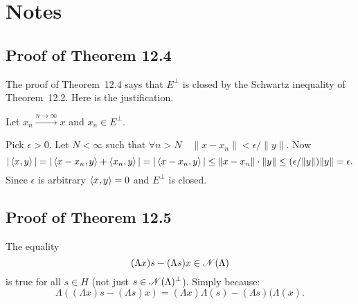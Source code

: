 
\section{Notes}

\subsection{Proof of Theorem 12.4}


The proof of Theorem~12.4 says that \(E^\perp\) is closed by the
Schwartz inequality of Theorem~12.2. Here is the justification.

Let \(x_n \xrightarrow{n\to \infty} x\) and \(x_n \in E^\perp\).

Pick \(\epsilon > 0\). Let \(N<\infty\) such that
\(\forall n>N \quad \|x-x_n\| < \epsilon/\|y\|\).
Now
\begin{equation*}
|\left\langle x, y \right\rangle| = |\left\langle x-x_n, y \right\rangle + \left\langle x_n, y \right\rangle| =
  |\left\langle x-x_n, y \right\rangle| 
 \leq \|x - x_n\|\cdot \|y\| \leq (\epsilon/\|y\|)\|y\| = \epsilon.
\end{equation*}
Since \(\epsilon\) is arbitrary \(\left\langle x,y \right\rangle = 0\) and \(E^\perp\) is closed.

\subsection{Proof of Theorem 12.5}

The equality
\begin{equation*}
(\Lambda x)s - (\Lambda s)x \in \mathscr{N}(\Lambda)
\end{equation*}
is true for all \(s\in H\) (not just \(s\in \mathscr{N}(\Lambda)^\perp\)).
Simply because:
\begin{equation*}
\Lambda\left((\Lambda x)s - (\Lambda s)x\right)
= (\Lambda x)\Lambda(s) - (\Lambda s)(\Lambda(x).
\end{equation*}

